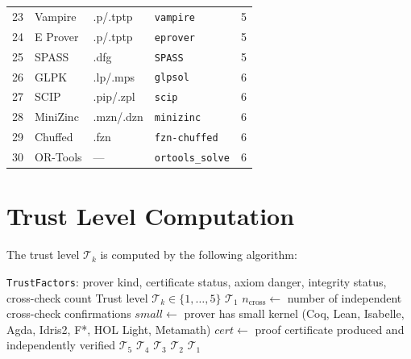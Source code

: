 \documentclass[11pt,a4paper]{article}
\newcommand{\trustlevel}[1]{\ensuremath{\mathcal{T}_{#1}}}
\begin{document}
\begin{table}[htbp]
\begin{tabular}{@{}rlllc@{}}
23 & Vampire     & .p/.tptp    & \texttt{vampire}       & 5 \\
24 & E Prover    & .p/.tptp    & \texttt{eprover}       & 5 \\
25 & SPASS       & .dfg        & \texttt{SPASS}         & 5 \\
26 & GLPK        & .lp/.mps    & \texttt{glpsol}        & 6 \\
27 & SCIP        & .pip/.zpl   & \texttt{scip}          & 6 \\
28 & MiniZinc    & .mzn/.dzn   & \texttt{minizinc}      & 6 \\
29 & Chuffed     & .fzn        & \texttt{fzn-chuffed}   & 6 \\
30 & OR-Tools    & ---         & \texttt{ortools\_solve} & 6 \\
\bottomrule
\end{tabular}
\end{table}

\section{Trust Level Computation}
\label{app:trust-computation}

The trust level $\trustlevel{k}$ is computed by the following algorithm:

\begin{algorithm}[htbp]
\caption{Trust Level Computation}
\label{alg:trust-level}
\begin{algorithmic}[1]
\Require \texttt{TrustFactors}: prover kind, certificate status, axiom danger, integrity status, cross-check count
\Ensure Trust level $\trustlevel{k} \in \{1, \ldots, 5\}$
  \State \Return $\trustlevel{1}$
\EndIf
\State $n_{\text{cross}} \gets$ number of independent cross-check confirmations
\State $\mathit{small} \gets$ prover has small kernel (Coq, Lean, Isabelle, Agda, Idris2, F*, HOL Light, Metamath)
\State $\mathit{cert} \gets$ proof certificate produced and independently verified
  \State \Return $\trustlevel{5}$
  \State \Return $\trustlevel{4}$
  \State \Return $\trustlevel{3}$
  \State \Return $\trustlevel{2}$
\Else
  \State \Return $\trustlevel{1}$
\EndIf
\end{algorithmic}
\end{algorithm}
\end{document}
